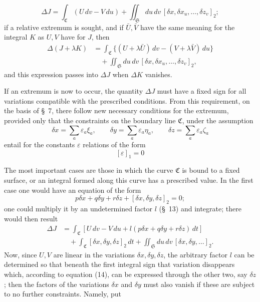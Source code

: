 \documentclass[11pt,a4paper,leqno]{article}
\begin{document}
\[
\Delta J=\int_{\mathfrak{C}}(U\,dv-V\,du)
+\iint_{\mathfrak{S}}du\,dv\,
[\delta x,\delta x_u,\ldots,\delta z_v]_2;
\]
if a relative extremum is sought, and if $\bar U,\bar V$ have the same meaning
for the integral $K$ as $U,V$ have for $J$, then
\begin{equation}\tag{13}
\begin{aligned}
\Delta(J+\lambda K)
&=\int_{\mathfrak{C}}
\{(U+\lambda\bar U)\,dv-(V+\lambda\bar V)\,du\}\\
&\quad+\iint_{\mathfrak{S}}du\,dv\,
[\delta x,\delta x_u,\ldots,\delta z_v]_2,
\end{aligned}
\end{equation}
and this expression passes into $\Delta J$ when $\Delta K$ vanishes.

If an extremum is now to occur, the quantity $\Delta J$ must have a fixed sign
for all variations compatible with the prescribed conditions. From this
requirement, on the basis of \S~7, there follow new necessary conditions for
the extremum, provided only that the constraints on the boundary line
$\mathfrak{C}$, under the assumption
\[
\delta x=\sum_a\varepsilon_a\xi_a,\qquad
\delta y=\sum_a\varepsilon_a\eta_a,\qquad
\delta z=\sum_a\varepsilon_a\zeta_a
\]
entail for the constants $\varepsilon$ relations of the form
\[
[\varepsilon]_1=0
\]

The most important cases are those in which the curve $\mathfrak{C}$ is bound
to a fixed surface, or an integral formed along this curve has a prescribed
value. In the first case one would have an equation of the form
\begin{equation}\tag{14}
p\delta x+q\delta y+r\delta z+[\delta x,\delta y,\delta z]_2=0;
\end{equation}
one could multiply it by an undetermined factor $l$ (\S~13) and integrate;
there would then result
\[
\begin{aligned}
\Delta J
&=\int_{\mathfrak{C}}
[U\,dv-V\,du+l(p\delta x+q\delta y+r\delta z)\,dt]\\
&\quad+\int_{\mathfrak{C}}[\delta x,\delta y,\delta z]_2\,dt
+\iint_{\mathfrak{S}}du\,dv\,[\delta x,\delta y,\ldots]_2.
\end{aligned}
\]
Now, since $U,V$ are linear in the variations $\delta x,\delta y,\delta z$,
the arbitrary factor $l$ can be determined so that beneath the first integral
sign that variation disappears which, according to equation (14), can be
expressed through the other two, say $\delta z$; then the factors of the
variations $\delta x$ and $\delta y$ must also vanish if these are subject to
no further constraints. Namely, put
\end{document}
